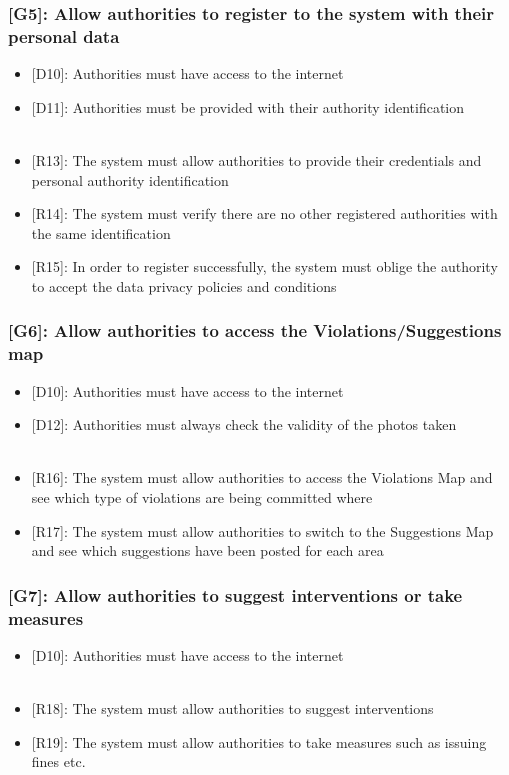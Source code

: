 \documentclass[12pt,a4paper]{article}
\begin{document}
\subsubsection*{{[}{G5}{]}: Allow authorities to register to the system with their personal data}
\begin{itemize}
\item {[D10]}: Authorities must have access to the internet
\item {[D11]}: Authorities must be provided with their authority identification
\\\\
\item {[R13]}: The system must allow authorities to provide their credentials and personal authority identification
\item {[R14]}: The system must verify there are no other registered authorities with the same identification
\item {[R15]}: In order to register successfully, the system must oblige the authority to accept the data privacy policies and conditions
\end{itemize}
\subsubsection*{{[}{G6}{]}: Allow authorities to access the Violations/Suggestions map}
\begin{itemize}
\item {[D10]}: Authorities must have access to the internet
\item {[D12]}: Authorities must always check the validity of the photos taken
\\\\
\item {[R16]}: The system must allow authorities to access the Violations Map and see which type of violations are being committed where
\item {[R17]}: The system must allow authorities to switch to the Suggestions Map and see which suggestions have been posted for each area
\end{itemize}
\subsubsection*{{[}{G7}{]}: Allow authorities to suggest interventions or take measures}
\begin{itemize}
\item {[D10]}: Authorities must have access to the internet
\\\\
\item {[R18]}: The system must allow authorities to suggest interventions
\item {[R19]}: The system must allow authorities to take measures such as issuing fines etc.
\end{itemize}
\end{document}

